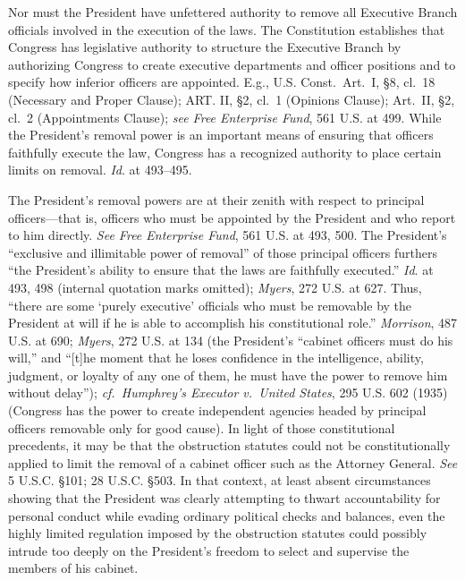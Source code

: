 Nor must the President have unfettered authority to remove all Executive Branch officials involved in the execution of the laws.
The Constitution establishes that Congress has legislative authority to structure the Executive Branch by authorizing Congress to create executive departments and officer positions and to specify how inferior officers are appointed.
E.g., U.S. Const.\ Art.~I, \S 8, cl.~18 (Necessary and Proper Clause); ART. II, \S 2, cl.~1 (Opinions Clause); Art.~II, \S 2, cl.~2 (Appointments Clause);
\textit{see Free Enterprise Fund}, 561 U.S. at 499. While the President’s removal power is an important means of ensuring that officers faithfully execute the law, Congress has a recognized authority to place certain limits on removal.
\textit{Id}. at 493--495.

The President’s removal powers are at their zenith with respect to principal officers---that is, officers who must be appointed by the President and who report to him directly.
\textit{See Free Enterprise Fund}, 561 U.S. at 493, 500.
The President’s “exclusive and illimitable power of removal” of those principal officers furthers “the President’s ability to ensure that the laws are faithfully executed.”
\textit{Id}. at 493, 498 (internal quotation marks omitted);
\textit{Myers}, 272 U.S. at 627.
Thus, “there are some ‘purely executive’ officials who must be removable by the President at will if he is able to accomplish his constitutional role.”
\textit{Morrison}, 487 U.S. at 690;
\textit{Myers}, 272 U.S. at 134 (the President’s “cabinet officers must do his will,” and “[t]he moment that he loses confidence in the intelligence, ability, judgment, or loyalty of any one of them, he must have the power to remove him without delay”);
\textit{cf.~Humphrey’s Executor v.\ United States}, 295 U.S. 602 (1935) (Congress has the power to create independent agencies headed by principal officers removable only for good cause).
In light of those constitutional precedents, it may be that the obstruction statutes could not be constitutionally applied to limit the removal of a cabinet officer such as the Attorney General.
\textit{See} 5 U.S.C. \S 101; 28 U.S.C. \S 503.
In that context, at least absent circumstances showing that the President was clearly attempting to thwart accountability for personal conduct while evading ordinary political checks and balances, even the highly limited regulation imposed by the obstruction statutes could possibly intrude too deeply on the President’s freedom to select and supervise the members of his cabinet.

